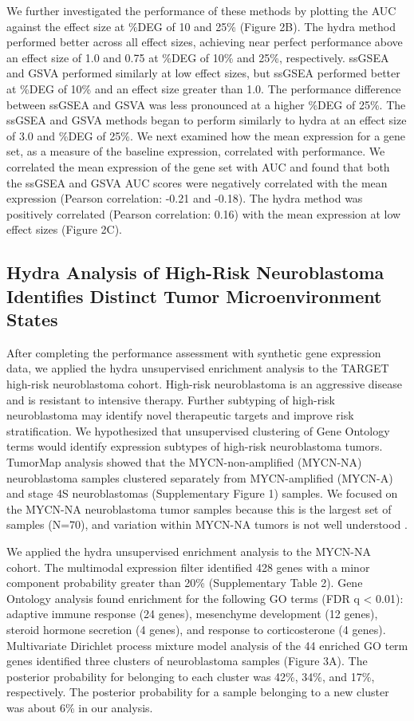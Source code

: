 \documentclass[10pt,letterpaper]{article}
\begin{document}
We further investigated the performance of these methods by plotting the AUC against the effect size at \%DEG of 10 and 25\% (Figure 2B). The hydra method performed better across all effect sizes, achieving near perfect performance above an effect size of 1.0 and 0.75 at \%DEG of 10\% and 25\%, respectively. ssGSEA and GSVA performed similarly at low effect sizes, but ssGSEA performed better at \%DEG of 10\% and an effect size greater than 1.0. The performance difference between ssGSEA and GSVA was less pronounced at a higher \%DEG of 25\%. The ssGSEA and GSVA methods began to perform similarly to hydra at an effect size of 3.0 and \%DEG of 25\%. We next examined how the mean expression for a gene set, as a measure of the baseline expression, correlated with performance. We correlated the mean expression of the gene set with AUC and found that both the ssGSEA and GSVA AUC scores were negatively correlated with the mean expression (Pearson correlation: -0.21 and -0.18). The hydra method was positively correlated (Pearson correlation: 0.16) with the mean expression at low effect sizes (Figure 2C).

\subsection{Hydra Analysis of High-Risk Neuroblastoma Identifies Distinct Tumor Microenvironment States}
After completing the performance assessment with synthetic gene expression data, we applied the hydra unsupervised enrichment analysis to the TARGET high-risk neuroblastoma cohort. High-risk neuroblastoma is an aggressive disease and is resistant to intensive therapy. Further subtyping of high-risk neuroblastoma may identify novel therapeutic targets and improve risk stratification. We hypothesized that unsupervised clustering of Gene Ontology terms would identify expression subtypes of high-risk neuroblastoma tumors. TumorMap analysis showed that the MYCN-non-amplified (MYCN-NA) neuroblastoma samples clustered separately from MYCN-amplified (MYCN-A) and stage 4S neuroblastomas (Supplementary Figure 1) samples. We focused on the MYCN-NA neuroblastoma tumor samples because this is the largest set of samples (N=70), and variation within MYCN-NA tumors is not well understood \cite{morgenstern2019challenge}.

We applied the hydra unsupervised enrichment analysis to the MYCN-NA cohort. The multimodal expression filter identified 428 genes with a minor component probability greater than 20\% (Supplementary Table 2). Gene Ontology analysis found enrichment for the following GO terms (FDR q < 0.01): adaptive immune response (24 genes), mesenchyme development (12 genes), steroid hormone secretion (4 genes), and response to corticosterone (4 genes). Multivariate Dirichlet process mixture model analysis of the 44 enriched GO term genes identified three clusters of neuroblastoma samples (Figure 3A). The posterior probability for belonging to each cluster was 42\%, 34\%, and 17\%, respectively. The posterior probability for a sample belonging to a new cluster was about 6\% in our analysis. 
\end{document}
